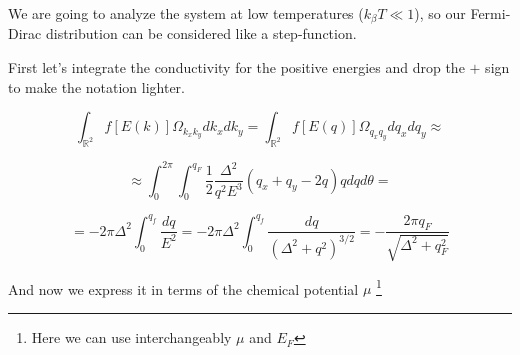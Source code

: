 We are going to analyze the system at low temperatures ($k_\beta T\ll 1$), so our Fermi-Dirac distribution can be considered like a step-function.

First let's integrate the conductivity for the positive energies and drop the $+$ sign to make the notation lighter.

\[
    \int_{\mathbb R^2} f[E(k)]\Omega_{k_xk_y}dk_xdk_y=\int_{\mathbb R^2} f[E(q)]\Omega_{q_xq_y}dq_xdq_y\approx
\]

\[
    \approx\int_{0}^{2\pi}\int_{0}^{q_F}\frac12 \frac{\Delta^2}{q^2E^3}(q_x+q_y-2q)qdqd\theta=
\]

\[
    =-2\pi\Delta^2\int_0^{q_f}\frac{dq}{E^2} =-2\pi\Delta^2\int_0^{q_f}\frac{dq}{(\Delta^2+q^2)^{3/2}}= 
    -\frac{2\pi q_F}{\sqrt{\Delta^2+q_F^2}}
\]

And now we express it in terms of the chemical potential $\mu$ \footnote{Here we can use interchangeably $\mu$ and $E_F$}


